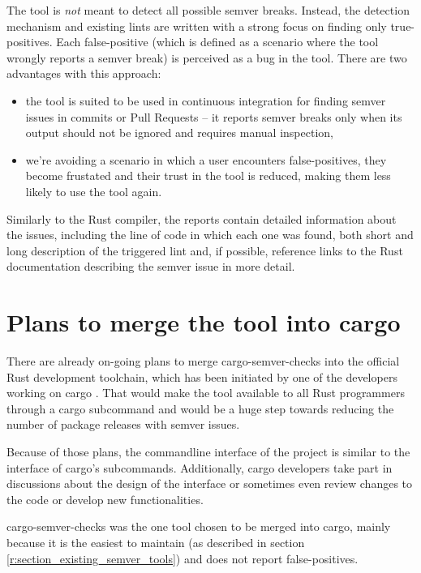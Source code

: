 \documentclass[licencjacka,en]{pracamgr}
\begin{document}
The tool is \textit{not} meant to detect all possible semver breaks. Instead, the detection
mechanism and existing lints are written with a strong focus on finding only true-positives.
Each false-positive (which is defined as a scenario where the tool wrongly reports a semver break)
is perceived as a bug in the tool. There are two advantages with this approach:
\begin{itemize}
	\item the tool is suited to be used in continuous integration for finding semver issues in
		commits or Pull Requests -- it reports semver breaks only when its output should not be
		ignored and requires manual inspection,
	\item we're avoiding a scenario in which a user encounters false-positives, they become
		frustated and their trust in the tool is reduced, making them less likely to use the
		tool again.
\end{itemize}

Similarly to the Rust compiler, the reports contain detailed information about the issues,
including the line of code in which each one was found, both short and long description of the
triggered lint and, if possible, reference links to the Rust documentation describing the semver
issue in more detail.

\section{Plans to merge the tool into cargo}\label{r:section_merge_into_cargo_plans}

There are already on-going plans to merge cargo-semver-checks into the official Rust development
toolchain, which has been initiated by one of the developers working on cargo
\cite{issue-merge-cargo}. That would make the tool available to all Rust programmers through
a cargo subcommand and would be a huge step towards reducing the number of package releases with
semver issues.

Because of those plans, the commandline interface of the project is similar to the interface of
cargo's subcommands. Additionally, cargo developers take part in discussions about the design of
the interface \cite{issue-cli-interface} or sometimes even review changes to the code or develop
new functionalities.

cargo-semver-checks was the one tool chosen to be merged into cargo, mainly because it is the
easiest to maintain (as described in section \ref{r:section_existing_semver_tools}) and does not
report false-positives.
\end{document}

